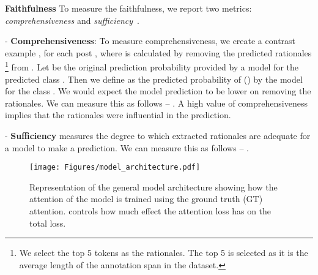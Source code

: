 \documentclass[letterpaper]{article} \usepackage{aaai21}  \usepackage{times}  \usepackage{helvet} \usepackage{courier}  \usepackage[hyphens]{url}  \usepackage{graphicx} \urlstyle{rm} \def\UrlFont{\rm}  \usepackage{natbib}  \usepackage{caption}
\begin{document}
\noindent\textbf{Faithfulness}
To measure the faithfulness, we report two metrics: \textit{comprehensiveness} and \textit{sufficiency}~\cite{deyoung2019eraser}.
\begin{compactitem}
    \item[-]  \textbf{Comprehensiveness}: To measure comprehensiveness, we create a contrast example , for each post ,
    where  is calculated by removing the predicted rationales \footnote{We select the top 5 tokens as the rationales. The top 5 is selected as it is the average length of the annotation span in the dataset.} from . Let  be the original prediction probability provided by a model  for the predicted class . Then we define  as the predicted probability of  () by the   model  for the  class .
    We would expect the model prediction to be lower on removing the rationales. We can measure this as follows -- .
    A high value of comprehensiveness implies that the rationales were influential in the prediction.
    
    \item[-] \textbf{Sufficiency} measures the degree to which extracted rationales are adequate for a model to make a prediction. We can measure this as follows -- .
\end{compactitem}


\begin{figure}[!th]
    \centering
    \texttt{[image: Figures/model\_architecture.pdf]}
    \caption{Representation of the general model architecture showing how the attention of the model is trained using the ground truth (GT) attention.  controls how much effect the attention loss has on the total loss.}
    \label{fig:model_archi}
\end{figure}
\end{document}
